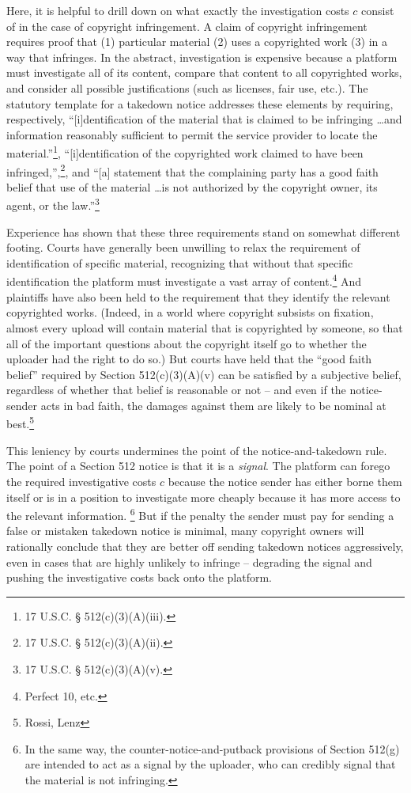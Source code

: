 Here, it is helpful to drill down on what exactly the investigation costs $c$ consist of in the case of copyright infringement.  A claim of copyright infringement requires proof that (1) particular material (2) uses a copyrighted work (3) in a way that infringes. In the abstract, investigation is expensive because a platform must investigate all of its content, compare that content to all copyrighted works, and consider all possible justifications (such as licenses, fair use, etc.).  The statutory template for a takedown notice addresses these elements by requiring, respectively, ``[i]dentification of the material that is claimed to be infringing \ldots and information reasonably sufficient to permit the service provider to locate the material.''\footnote{17 U.S.C. § 512(c)(3)(A)(iii).}, ``[i]dentification of the copyrighted work claimed to have been infringed,'',\footnote{17 U.S.C. § 512(c)(3)(A)(ii).}, and ``[a] statement that the complaining party has a good faith belief that use of the material \ldots  is not authorized by the copyright owner, its agent, or the law.''\footnote{17 U.S.C. § 512(c)(3)(A)(v).}

Experience has shown that these three requirements stand on somewhat different footing. Courts have generally been unwilling to relax the requirement of identification of specific material, recognizing that without that specific identification the platform must investigate a vast array of content.\footnote{Perfect 10, etc.} And plaintiffs have also been held to the requirement that they identify the relevant copyrighted works. (Indeed, in a world where copyright subsists on fixation, almost every upload will contain material that is copyrighted by someone, so that all of the important questions about the copyright itself go to whether the uploader had the right to do so.) But courts have held that the ``good faith belief'' required by Section 512(c)(3)(A)(v) can be satisfied by a subjective belief, regardless of whether that belief is reasonable or not -- and even if the notice-sender acts in bad faith, the damages against them are likely to be nominal at best.\footnote{Rossi, Lenz}

This leniency by courts undermines the point of the notice-and-takedown rule. The point of a Section 512 notice is that it is a \emph{signal}. The platform can forego the required investigative costs $c$ because the notice sender has either borne them itself or is in a position to investigate more cheaply because it has more access to the relevant information. \footnote{In the same way, the counter-notice-and-putback provisions of Section 512(g) are intended to act as a signal by the uploader, who can credibly signal that the material is not infringing.} But if the penalty the sender must pay for sending a false or mistaken takedown notice is minimal, many copyright owners will rationally conclude that they are better off sending takedown notices aggressively, even in cases that are highly unlikely to infringe -- degrading the signal and pushing the investigative costs back onto the platform. 

